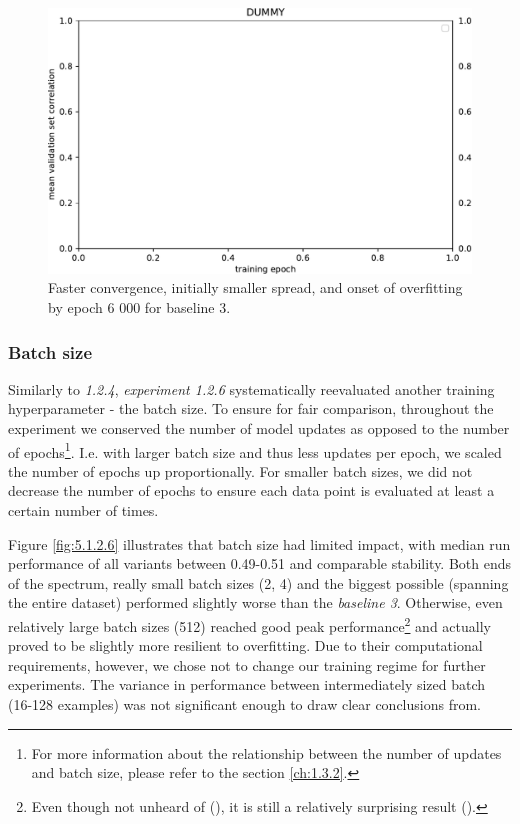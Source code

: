 \begin{figure}[H]
    \centering
    \includegraphics[width=1\textwidth]{../figures/05_dummy}
    \caption[Experiment 5.1.2.5]{Faster convergence, initially smaller spread, and onset of overfitting by epoch 6 000 for baseline 3.}
    \label{fig:5.1.2.5}
\end{figure}

\subsubsection{Batch size}

Similarly to \textit{1.2.4}, \textit{experiment 1.2.6} systematically reevaluated another training hyperparameter - the batch size. To ensure for fair comparison, throughout the experiment we conserved the number of model updates as opposed to the number of epochs\footnote{For more information about the relationship between the number of updates and batch size, please refer to the section \ref{ch:1.3.2}.}. I.e. with larger batch size and thus less updates per epoch, we scaled the number of epochs up proportionally. For smaller batch sizes, we did not decrease the number of epochs to ensure each data point is evaluated at least a certain number of times.

Figure \ref{fig:5.1.2.6} illustrates that batch size had limited impact, with median run performance of all variants between 0.49-0.51 and comparable stability. Both ends of the spectrum, really small batch sizes (2, 4) and the biggest possible (spanning the entire dataset) performed slightly worse than the \textit{baseline 3}. Otherwise, even relatively large batch sizes (512) reached good peak performance\footnote{Even though not unheard of (\cite{2017arXiv171100489S}), it is still a relatively surprising result (\cite{2017arXiv170508741H}).} and actually proved to be slightly more resilient to overfitting. Due to their computational requirements, however, we chose not to change our training regime for further experiments. The variance in performance between intermediately sized batch (16-128 examples) was not significant enough to draw clear conclusions from.

